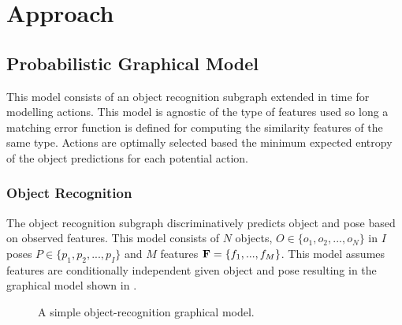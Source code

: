 \section{Approach}


    \subsection{Probabilistic Graphical Model}
        This model consists of an object recognition subgraph extended in time for modelling actions. This model is agnostic of the type of features used so long a matching error function is defined for computing the similarity features of the same type. Actions are optimally selected based the minimum expected entropy of the object predictions for each potential action.
            
        \subsubsection{Object Recognition}
            The object recognition subgraph discriminatively predicts object and pose based on observed features. This model consists of $N$ objects, $O \in \{o_1,o_2, ..., o_N\}$ in $I$ poses $P \in \{p_1,p_2, ..., p_I\}$ and $M$ features $\mathbf{F} = \left\{ f_1, ...,  f_M\right\}$. This model assumes features are conditionally independent given object and pose resulting in the graphical model shown in .

            \begin{figure}[h]
              \centering
              \caption{A simple object-recognition graphical model.}
              \label{fig:objectRecognitionSubgraph}
            \end{figure}

